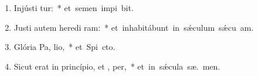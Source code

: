 \begin{flushleft}
\begin{enumerate}[leftmargin=*]
\item Injústi tur:~* \mbox{et semen impi bit.}
\item Justi autem heredi ram:~* \mbox{et inhabitábunt in s\'{\ae}culum s\'{\ae}cu  am.}
\item Glória Pa,  lio,~* \mbox{et Spi cto.}
\item Sicut erat in princípio, et ,  per,~* \mbox{et in s\'{\ae}cula sæ. men.}

\end{enumerate}
\end{flushleft}

